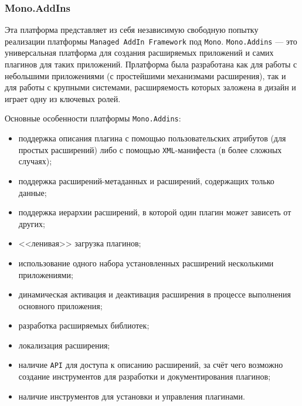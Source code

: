 \subsubsection{Mono.AddIns}

Эта платформа представляет из себя независимую свободную попытку реализации платформы {\tt Managed AddIn Framework} под {\tt Mono}.
{\tt Mono.Addins} --- это универсальная платформа для создания расширяемых приложений и самих плагинов для таких приложений. Прлатформа была разработана  как для работы с небольшими приложениями (с простейшими механизмами расширения), так и для работы с крупными системами, расширяемость которых заложена в дизайн и играет одну из ключевых ролей.

Основные особенности платформы {\tt Mono.Addins}:
\begin{itemize}
  \item поддержка описания плагина с помощью пользовательских атрибутов (для простых расширений) либо с помощью {\tt XML}-манифеста (в более сложных случаях);
  \item поддержка расширений-метаданных и расширений, содержащих только данные;
  \item поддержка иерархии расширений, в которой один плагин может зависеть от других;
  \item <<ленивая>> загрузка плагинов;
  \item использование одного набора установленных расширений несколькими приложениями;
  \item динамическая активация и деактивация расширения в процессе выполнения основного приложения;
  \item разработка расширяемых библиотек;
  \item локализация расширения;
  \item наличие {\tt API} для доступа к описанию расширений, за счёт чего возможно создание инструментов для разработки и документирования плагинов;
  \item наличие инструментов для установки и управления плагинами.
\end{itemize}
